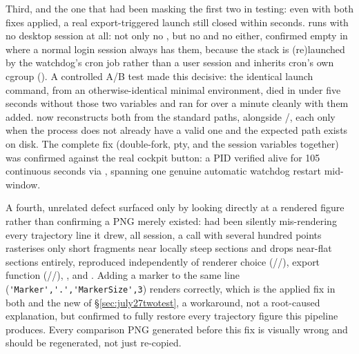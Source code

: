 Third, and the one that had been masking the first two in testing: even with
both fixes applied, a real export-triggered launch still closed within
seconds.  runs with no desktop session at all: not
only no , but no  and no
 either, confirmed empty in
 where a normal login session always has them,
because the stack is (re)launched by the watchdog's cron job rather than a
user session and inherits cron's own cgroup
(). A controlled A/B test made this decisive:
the identical launch command, from an otherwise-identical minimal
environment, died in under five seconds without those two variables and ran
for over a minute cleanly with them added.  now
reconstructs both from the standard  paths, alongside
/, each only when the process does not already
have a valid one and the expected path exists on disk. The complete fix (double-fork, pty, and the session variables together) was confirmed
against the real cockpit button: a PID verified alive for 105 continuous
seconds via , spanning one genuine automatic
watchdog restart mid-window.

A fourth, unrelated defect surfaced only by looking directly at a rendered
figure rather than confirming a PNG merely existed: 
had been silently mis-rendering every trajectory line it drew, all
session, a  call with several hundred
points rasterises only short fragments near locally steep sections and drops
near-flat sections entirely, reproduced independently of renderer choice
(//), export function
(//), , and
. Adding a marker to the same line
(\verb|'Marker','.','MarkerSize',3|) renders correctly, which is the applied
fix in both  and the new
 of \S\ref{sec:july27twotest}, a workaround, not a
root-caused explanation, but confirmed to fully restore every trajectory
figure this pipeline produces. Every comparison PNG generated before this fix
is visually wrong and should be regenerated, not just re-copied.

